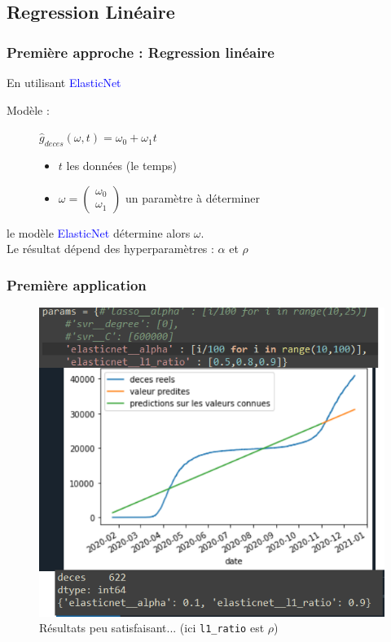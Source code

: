 \documentclass{beamer}[aspectratio = 43]
\begin{document}
\subsection{Regression Linéaire}
\begin{frame}
	\frametitle{Première approche : Regression linéaire}
	En utilisant \textcolor{blue}{ElasticNet} %
	
	\vspace{0.23 cm}
	Modèle :
	\begin{figure}[h]
		\begin{minipage}{0.35\textwidth}
			$\hat{g}_{deces} (\omega,t) =\omega_{0} +  \omega_{1} t$
		\end{minipage}%
		\begin{minipage}{0.65\textwidth}
			\begin{itemize}
				\item[] $t$ les données (le temps)
				\item[] 
				$\omega = 
				\begin{pmatrix}
					\omega_{0} \\
					\omega_{1}
				\end{pmatrix}$ un paramètre à déterminer
			\end{itemize}
		\end{minipage}
	\end{figure}
	\vspace{20pt}
	le modèle \textcolor{blue}{ElasticNet} détermine alors $\omega$.\\
	Le résultat dépend des hyperparamètres : $\alpha$ et $\rho$
	

\end{frame}

\begin{frame}
	\frametitle{Première application}
	\begin{figure}
		\includegraphics[scale=0.38]{EN}
		\caption{Résultats peu satisfaisant... (ici \texttt{l1\_ratio} est $\rho$)}
	\end{figure}
\end{frame}
\end{document}
